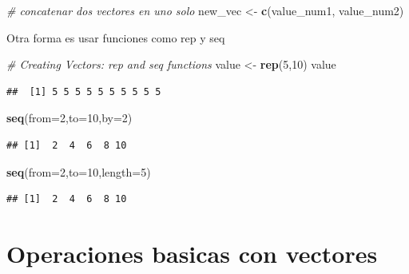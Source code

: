 \documentclass[
]{book}
\newenvironment{Shaded}{\begin{snugshade}}{\end{snugshade}}
\newcommand{\CommentTok}[1]{\textcolor[rgb]{0.56,0.35,0.01}{\textit{#1}}}
\newcommand{\DataTypeTok}[1]{\textcolor[rgb]{0.13,0.29,0.53}{#1}}
\newcommand{\DecValTok}[1]{\textcolor[rgb]{0.00,0.00,0.81}{#1}}
\newcommand{\KeywordTok}[1]{\textcolor[rgb]{0.13,0.29,0.53}{\textbf{#1}}}
\newcommand{\NormalTok}[1]{#1}
\newcommand{\StringTok}[1]{\textcolor[rgb]{0.31,0.60,0.02}{#1}}
\begin{document}
\begin{Shaded}
\begin{Highlighting}[]
\CommentTok{# concatenar dos vectores en uno solo}
\NormalTok{new_vec <-}\StringTok{ }\KeywordTok{c}\NormalTok{(value_num1, value_num2)}
\end{Highlighting}
\end{Shaded}

Otra forma es usar funciones como rep y seq

\begin{Shaded}
\begin{Highlighting}[]
\CommentTok{# Creating Vectors: rep and seq functions}
\NormalTok{value <-}\StringTok{ }\KeywordTok{rep}\NormalTok{(}\DecValTok{5}\NormalTok{,}\DecValTok{10}\NormalTok{)}
\NormalTok{value}
\end{Highlighting}
\end{Shaded}

\begin{verbatim}
##  [1] 5 5 5 5 5 5 5 5 5 5
\end{verbatim}

\begin{Shaded}
\begin{Highlighting}[]
\KeywordTok{seq}\NormalTok{(}\DataTypeTok{from=}\DecValTok{2}\NormalTok{,}\DataTypeTok{to=}\DecValTok{10}\NormalTok{,}\DataTypeTok{by=}\DecValTok{2}\NormalTok{)}
\end{Highlighting}
\end{Shaded}

\begin{verbatim}
## [1]  2  4  6  8 10
\end{verbatim}

\begin{Shaded}
\begin{Highlighting}[]
\KeywordTok{seq}\NormalTok{(}\DataTypeTok{from=}\DecValTok{2}\NormalTok{,}\DataTypeTok{to=}\DecValTok{10}\NormalTok{,}\DataTypeTok{length=}\DecValTok{5}\NormalTok{)}
\end{Highlighting}
\end{Shaded}

\begin{verbatim}
## [1]  2  4  6  8 10
\end{verbatim}

\hypertarget{operaciones-basicas-con-vectores}{%
\section{Operaciones basicas con vectores}\label{operaciones-basicas-con-vectores}}
\end{document}
